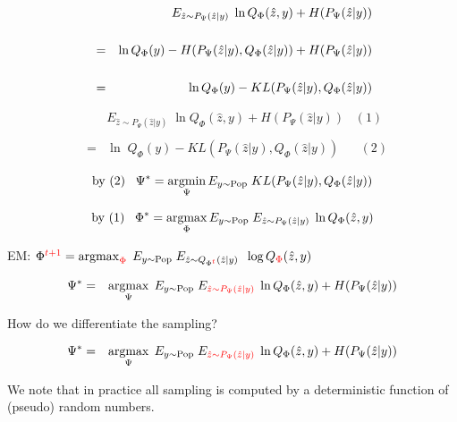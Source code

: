 {
\begin{eqnarray*}
  & & E_{\hat{z} \sim P_\Psi(\hat{z}|y)}\;\ln Q_\Phi(\hat{z},y) + H(P_\Psi(\hat{z}|y))\\
  \\
  & = & \ln Q_\Phi(y) - H(P_\Psi(\hat{z}|y), Q_\Phi(\hat{z}|y)) + H(P_\Psi(\hat{z}|y)) \\
  \\
  & = & \ln Q_\Phi(y) - KL(P_\Psi(\hat{z}|y),Q_\Phi(\hat{z}|y)) \\
\end{eqnarray*}


\begin{eqnarray*}
& & E_{\hat{z} \sim P_\Psi(\hat{z}|y)}\; \ln Q_\Phi(\hat{z},y) + H(P_\Psi(\hat{z}|y))\;\;\;(1) \\
 \\      
  & = & \ln\;Q_{\Phi}(y) - KL(P_\Psi(\hat{z}|y),Q_{\Phi}(\hat{z}|y))\;\;\;\;\;\;(2)
\end{eqnarray*}

\vfill
$$\mbox{by (2)}\;\;\;\Psi^* = \operatorname*{argmin}_\Psi E_{y \sim \mathrm{Pop}} \; KL(P_\Psi(\hat{z}|y),Q_\Phi(\hat{z}|y))$$

$$\mbox{by (1)}\;\;\;\Phi^* = \operatorname*{argmax}_\Phi E_{y \sim \mathrm{Pop}} \;E_{\hat{z} \sim P_\Psi(\hat{z}|y)}\; \ln Q_\Phi(\hat{z},y)$$

\vfill
EM: $\Phi^{\color{red} t+1} = \operatorname*{argmax}_{\color{red} \Phi} \; E_{y \sim \mathrm{Pop}}\; E_{\hat{z} \sim Q_{\Phi^{\color{red} t}}(\hat{z}|y)}\; \;\log Q_{\color{red} \Phi}(\hat{z},y)$

\vfill
{}
\bigskip
\begin{eqnarray*}
\Psi^* & = & \operatorname*{argmax}_\Psi \; E_{y \sim \mathrm{Pop}}\;E_{\color{red} \hat{z} \sim P_\Psi(\hat{z}|y)}\;\ln Q_\Phi(\hat{z},y) + H(P_\Psi(\hat{z}|y))
\end{eqnarray*}

\vfill
How do we differentiate the sampling?

\vfill
{}
\bigskip
\begin{eqnarray*}
\Psi^* & = & \operatorname*{argmax}_\Psi \; E_{y \sim \mathrm{Pop}}\;E_{\color{red} \hat{z} \sim P_\Psi(\hat{z}|y)}\;\ln Q_\Phi(\hat{z},y) + H(P_\Psi(\hat{z}|y))
\end{eqnarray*}

\vfill
We note that in practice all sampling is computed by a deterministic function of (pseudo) random numbers.

}
